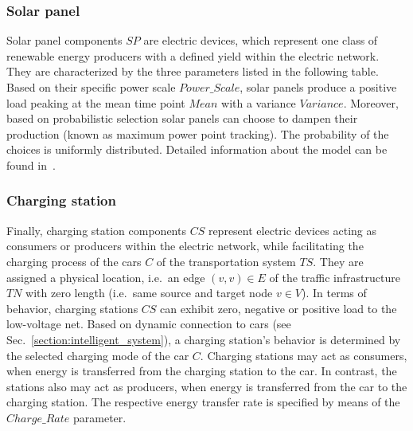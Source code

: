 \subsubsection*{Solar panel}

Solar panel components $SP$ are electric devices, which represent one class of renewable energy producers with a defined yield within the electric network. They are characterized by the three parameters listed in the following table. Based on their specific power scale $Power\_Scale$, solar panels produce a positive load peaking at the mean time point $Mean$ with a variance $Variance$. Moreover, based on probabilistic selection solar panels can choose to dampen their production (known as maximum power point tracking). The probability of the choices is uniformly distributed. Detailed information about the model can be found in~\cite{hackenberg2014rapid}.

\subsubsection*{Charging station}
\label{section:charging_station}

Finally, charging station components $CS$ represent electric devices acting as consumers or producers within the electric network, while facilitating the charging process of the cars $C$ of the transportation system $TS$. They are assigned a physical location, i.e.\ an edge $(v,v) \in E$ of the traffic infrastructure $TN$ with zero length (i.e.\ same source and target node $v \in V$). In terms of behavior, charging stations $CS$ can exhibit zero, negative or positive load to the low-voltage net. Based on dynamic connection to cars (see Sec.~\ref{section:intelligent_system}), a charging station's behavior is determined by the selected charging mode of the car $C$. Charging stations may act as consumers, when energy is transferred from the charging station to the car. In contrast, the stations also may act as producers, when energy is transferred from the car to the charging station. The respective energy transfer rate is specified by means of the $Charge\_Rate$ parameter.